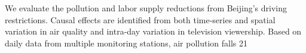 We evaluate the pollution and labor supply reductions from Beijing's driving restrictions. Causal effects are identified from both time-series and spatial variation in air quality and intra-day variation in television viewership. Based on daily data from multiple monitoring stations, air pollution falls 21%